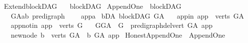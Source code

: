 %
\begin{isabellebody}%
%
%
\isadelimtheory
%
\endisadelimtheory
%
\isatagtheory
{}\isamarkupfalse%
\ ExtendblockDAG\isanewline
\ \ \ blockDAG\isanewline
{}%
\endisatagtheory
{\isafoldtheory}%
%
\isadelimtheory
%
\endisadelimtheory
%
\isadelimdocument
%
\endisadelimdocument
%
\isatagdocument
%
\isamarkuptrue%
%
\isamarkuptrue%
%
\endisatagdocument
{\isafolddocument}%
%
\isadelimdocument
%
\endisadelimdocument
{}\isamarkupfalse%
\ Append{\isacharunderscore}{\kern0pt}One\ {\isacharequal}{\kern0pt}\ blockDAG\ {\isacharplus}{\kern0pt}\isanewline
\ \ \ G{\isacharunderscore}{\kern0pt}A{\isacharcolon}{\kern0pt}{\isacharcolon}{\kern0pt}{\isachardoublequoteopen}{\isacharparenleft}{\kern0pt}{\isacharprime}{\kern0pt}a{\isacharcomma}{\kern0pt}{\isacharprime}{\kern0pt}b{\isacharparenright}{\kern0pt}\ pre{\isacharunderscore}{\kern0pt}digraph{\isachardoublequoteclose}\ {\isacharparenleft}{\kern0pt}\isanewline
\ \ \ app{\isacharcolon}{\kern0pt}{\isacharcolon}{\kern0pt}{\isacharprime}{\kern0pt}a\isanewline
{}\ bD{\isacharunderscore}{\kern0pt}A{\isacharcolon}{\kern0pt}\ {\isachardoublequoteopen}blockDAG\ G{\isacharunderscore}{\kern0pt}A{\isachardoublequoteclose}\isanewline
\ \ \ app{\isacharunderscore}{\kern0pt}in{\isacharcolon}{\kern0pt}\ {\isachardoublequoteopen}app\ {\isasymin}\ verts\ G{\isacharunderscore}{\kern0pt}A{\isachardoublequoteclose}\isanewline
\ \ \ app{\isacharunderscore}{\kern0pt}notin{\isacharcolon}{\kern0pt}\ {\isachardoublequoteopen}app\ {\isasymnotin}\ verts\ G{\isachardoublequoteclose}\isanewline
\ \ \ GG{\isacharunderscore}{\kern0pt}A\ {\isacharcolon}{\kern0pt}\ {\isachardoublequoteopen}G\ {\isacharequal}{\kern0pt}\ pre{\isacharunderscore}{\kern0pt}digraph{\isachardot}{\kern0pt}del{\isacharunderscore}{\kern0pt}vert\ G{\isacharunderscore}{\kern0pt}A\ app{\isachardoublequoteclose}\isanewline
\ \ \ new{\isacharunderscore}{\kern0pt}node{\isacharcolon}{\kern0pt}\ {\isachardoublequoteopen}{\isasymforall}b\ {\isasymin}\ verts\ G{\isacharunderscore}{\kern0pt}A{\isachardot}{\kern0pt}\ {\isasymnot}\ b\ {\isasymrightarrow}\isactrlbsub G{\isacharunderscore}{\kern0pt}A\isactrlesub \ app{\isachardoublequoteclose}\isanewline
\isanewline
{}\isamarkupfalse%
\ Honest{\isacharunderscore}{\kern0pt}Append{\isacharunderscore}{\kern0pt}One\ {\isacharequal}{\kern0pt}\ Append{\isacharunderscore}{\kern0pt}One\ {\isacharplus}{\kern0pt}\isanewline

\end{isabellebody}
